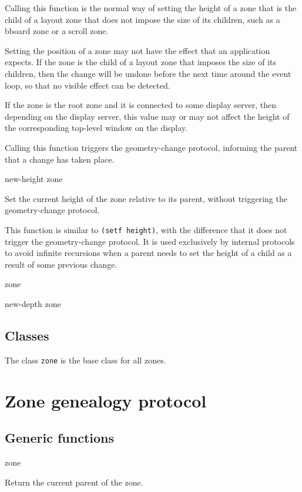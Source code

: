 Calling this function is the normal way of setting the height of a
zone that is the child of a layout zone that does not impose the
size of its children, such as a bboard zone or a scroll zone.

Setting the position of a zone may not have the effect that an
application expects.  If the zone is the child of a layout zone
that imposes the size of its children, then the change will be
undone before the next time around the event loop, so that no
visible effect can be detected.

If the zone is the root zone and it is connected to some display
server, then depending on the display server, this value may or
may not affect the height of the corresponding top-level window on
the display.

Calling this function triggers the geometry-change protocol,
informing the parent that a change has taken place.

 {new-height zone}

Set the current height of the zone relative to its parent, without
triggering the geometry-change protocol.

This function is similar to \texttt{(setf height)}, with the
difference that it does not trigger the geometry-change protocol.  It
is used exclusively by internal protocols to avoid infinite recursions
when a parent needs to set the height of a child as a result of some
previous change.

 {zone}

 {new-depth zone}

\subsection{Classes}


The class \texttt{zone} is the base class for all zones. 

\section{Zone genealogy protocol}

\subsection{Generic functions}

 {zone}

Return the current parent of the zone. 

